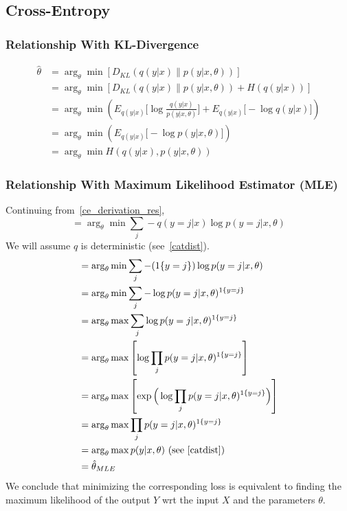 \documentclass{book}
\numberwithin{equation}{subsection}
\begin{document}
\subsection{Cross-Entropy}
\subsubsection{Relationship With KL-Divergence}
\begin{align}
    \hat{\theta}
    &= \arg_\theta \min[D_{KL}(q(y|x) \parallel p(y|x,\theta))]\\
    &= \arg_\theta \min[ D_{KL}(q(y|x) \parallel p(y|x,\theta)) + H(q(y|x))]\\
    &= \arg_\theta \min \left( E_{q(y|x)}\Big[\log\frac{q(y|x)}{p(y|x,\theta)}\Big] + E_{q(y|x)}\Big[-\log q(y|x)\Big]\right)\\
    &= \arg_\theta \min \left( E_{q(y|x)}\Big[-\log p(y|x,\theta)\Big]\right)\label{ce_derivation_res}\\
    &= \arg_\theta \min H(q(y|x), p(y|x,\theta))
\end{align}
\subsubsection{Relationship With Maximum Likelihood Estimator (MLE)}
\label{mle_ce}
Continuing from~\ref{ce_derivation_res},
\begin{equation}
    = \arg_\theta \min \sum_j -q(y=j|x)\log p(y=j|x,\theta)
\end{equation}
We will assume $q$ is deterministic (see~\ref{catdist}).
\begin{align}
    &= \arg_\theta \min \sum_j -(1\{y=j\})\log p(y=j|x,\theta)\\
    &= \arg_\theta \min \sum_j -\log p(y=j|x,\theta)^{1\{y=j\}}\\
    &= \arg_\theta \max \sum_j \log p(y=j|x,\theta)^{1\{y=j\}}\\
    &= \arg_\theta \max\left[\log\prod_j p(y=j|x,\theta)^{1\{y=j\}}\right]\\
    &= \arg_\theta \max\left[\exp\Big(\log\prod_j p(y=j|x,\theta)^{1\{y=j\}}\Big)\right]\\
    &= \arg_\theta \max\prod_j p(y=j|x,\theta)^{1\{y=j\}}\\
    &= \arg_\theta\max p(y|x,\theta) \ \text{(see~\ref{catdist})}\\
    &= \hat{\theta}_{MLE}\label{mle_ce_res}
\end{align}
We conclude that minimizing the corresponding loss is equivalent to finding the maximum likelihood of the output $Y$ wrt the input $X$ and the parameters $\theta$.
\end{document}
